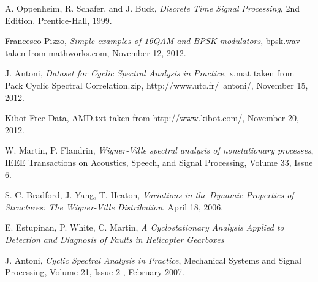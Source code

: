 \documentclass[journal]{IEEEtran}
\begin{document}
\begin{thebibliography}{1}
A. Oppenheim, R. Schafer, and J. Buck, \emph{Discrete Time Signal Processing}, 2nd Edition. Prentice-Hall, 1999.

Francesco Pizzo, \emph{Simple examples of 16QAM and BPSK modulators}, bpsk.wav taken from mathworks.com, November 12, 2012. 
    
J. Antoni, \emph{Dataset for Cyclic Spectral Analysis in Practice}, x.mat taken from Pack Cyclic Spectral Correlation.zip, http://www.utc.fr/~antoni/,
November 15, 2012.

Kibot Free Data, AMD.txt taken from http://www.kibot.com/, November 20, 2012.

W. Martin, P. Flandrin, \emph{Wigner-Ville spectral analysis of nonstationary processes}, IEEE Transactions on Acoustics, Speech, and Signal Processing, 
Volume 33, Issue 6.

S. C. Bradford, J. Yang, T. Heaton, \emph{Variations in the Dynamic Properties of Structures: The Wigner-Ville Distribution}. April 18, 2006. 

E. Estupinan, P. White, C. Martin, \emph{A Cyclostationary Analysis Applied to Detection and Diagnosis of Faults in Helicopter Gearboxes}

J. Antoni, \emph{Cyclic Spectral Analysis in Practice}, Mechanical Systems and Signal Processing, Volume 21, Issue 2 , February 2007.
\end{thebibliography}






\end{document}
